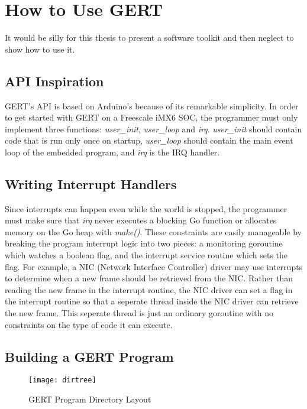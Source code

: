 \chapter{How to Use GERT}

It would be silly for this thesis to present a software toolkit and then
neglect to show how to use it.

\section{API Inspiration}
GERT's API is based on Arduino's because of its remarkable simplicity. In order to
get started with GERT on a Freescale iMX6 SOC, the programmer must only implement three functions: \textit{user\_init},
\textit{user\_loop} and \textit{irq}. \textit{user\_init} should contain code that is run only once
on startup, \textit{user\_loop} should contain the main event loop of the embedded program, and
\textit{irq} is the IRQ handler.

\section{Writing Interrupt Handlers}

Since interrupts can happen even while the world is stopped, the programmer must make sure that \textit{irq} never executes
a blocking Go function or allocates memory on the Go heap with \textit{make()}. These constraints are
easily manageable by breaking the program interrupt logic into two pieces: a monitoring
goroutine which watches a boolean flag, and the interrupt service routine which sets the flag.
For example, a NIC (Network Interface Controller) driver may use interrupts to determine when a new frame should be retrieved
from the NIC. Rather than reading the new frame in the interrupt routine, the NIC driver
can set a flag in the interrupt routine so that a seperate thread inside the NIC driver can retrieve
the new frame. This seperate thread is just an ordinary goroutine with no constraints on the type
of code it can execute.

\section{Building a GERT Program}

\begin{figure}[h]
\begin{center}
  \texttt{[image: dirtree]}
\end{center}
  \caption{GERT Program Directory Layout} \label{fig:dtree}
\end{figure}

